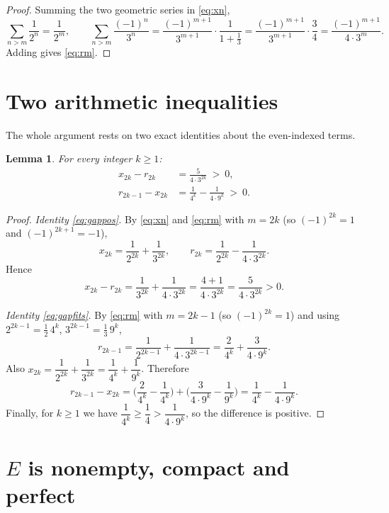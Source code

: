 \documentclass{amsart}
\newtheorem{lemma}{Lemma}
\theoremstyle{definition}
\begin{document}
\begin{proof}
Summing the two geometric series in \eqref{eq:xn},
$$\sum_{n>m}\frac{1}{2^n}=\frac{1}{2^{m}},\qquad
\sum_{n>m}\frac{(-1)^n}{3^n}
=\frac{(-1)^{m+1}}{3^{m+1}}\cdot\frac{1}{1+\tfrac13}
=\frac{(-1)^{m+1}}{3^{m+1}}\cdot\frac34
=\frac{(-1)^{m+1}}{4\cdot 3^{m}} .$$
Adding gives \eqref{eq:rm}.
\end{proof}

\section{Two arithmetic inequalities}

The whole argument rests on two exact identities about the even-indexed terms.

\begin{lemma}\label{lem:ineq}
For every integer $k\ge 1$:
\begin{align}
x_{2k}-r_{2k}&=\frac{5}{4\cdot 3^{2k}}\ >\ 0, \label{eq:gappos}\\[2pt]
r_{2k-1}-x_{2k}&=\frac{1}{4^{k}}-\frac{1}{4\cdot 9^{k}}\ >\ 0. \label{eq:gapfits}
\end{align}
\end{lemma}

\begin{proof}
\emph{Identity \eqref{eq:gappos}.}
By \eqref{eq:xn} and \eqref{eq:rm} with $m=2k$ (so $(-1)^{2k}=1$ and $(-1)^{2k+1}=-1$),
$$x_{2k}=\frac{1}{2^{2k}}+\frac{1}{3^{2k}},\qquad
r_{2k}=\frac{1}{2^{2k}}-\frac{1}{4\cdot 3^{2k}} .$$
Hence
$$x_{2k}-r_{2k}=\frac{1}{3^{2k}}+\frac{1}{4\cdot 3^{2k}}=\frac{4+1}{4\cdot 3^{2k}}=\frac{5}{4\cdot 3^{2k}}>0 .$$

\emph{Identity \eqref{eq:gapfits}.}
By \eqref{eq:rm} with $m=2k-1$ (so $(-1)^{2k}=1$) and using $2^{2k-1}=\tfrac12\,4^{k}$, $3^{2k-1}=\tfrac13\,9^{k}$,
$$r_{2k-1}=\frac{1}{2^{2k-1}}+\frac{1}{4\cdot 3^{2k-1}}
=\frac{2}{4^{k}}+\frac{3}{4\cdot 9^{k}} .$$
Also $x_{2k}=\dfrac{1}{2^{2k}}+\dfrac{1}{3^{2k}}=\dfrac{1}{4^{k}}+\dfrac{1}{9^{k}}$. Therefore
$$r_{2k-1}-x_{2k}
=\Big(\frac{2}{4^{k}}-\frac{1}{4^{k}}\Big)+\Big(\frac{3}{4\cdot 9^{k}}-\frac{1}{9^{k}}\Big)
=\frac{1}{4^{k}}-\frac{1}{4\cdot 9^{k}} .$$
Finally, for $k\ge1$ we have $\dfrac{1}{4^{k}}\ge\dfrac14>\dfrac{1}{4\cdot 9^{k}}$, so the difference is positive.
\end{proof}

\section{$E$ is nonempty, compact and perfect}
\end{document}
